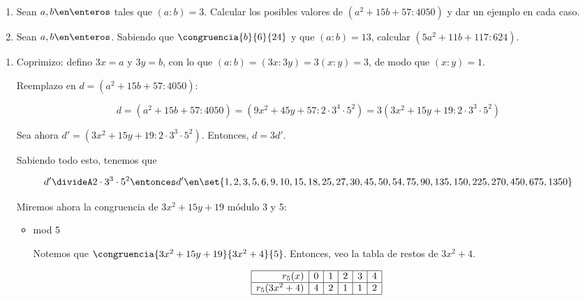 \begin{enunciado}{\ejercicio}

    \begin{enumerate}[label=(\alph*)]

        \item Sean $a,b \en \enteros$ tales que $(a:b)=3$. Calcular los posibles valores de $(a^2+15b+57:4050)$ y dar un ejemplo en cada caso.

        \item Sean $a,b \en \enteros$. Sabiendo que $\congruencia{b}{6}{24}$ y que $(a:b)=13$, calcular $(5a^2+11b+117:624)$.
    
    \end{enumerate}

\end{enunciado}

    \begin{enumerate}[label=(\alph*)]

        \item 

        Coprimizo: defino $3x=a$ y $3y=b$, con lo que $(a:b)=(3x:3y)=3(x:y)=3$, de modo que $(x:y)=1$. \bigskip

        Reemplazo en $d=(a^2+15b+57:4050):$ 

        $$
        d=(a^2+15b+57:4050) =
        (9x^2 + 45y +57:2 \cdot 3^4 \cdot 5^2)=
        3(3x^2 + 15y +19:2 \cdot 3^3 \cdot 5^2)
        $$

        Sea ahora $d'=(3x^2 + 15y +19:2 \cdot 3^3 \cdot 5^2)$. Entonces, $d=3d'$.\par
        Sabiendo todo esto, tenemos que

        $$
        d' \divideA 2 \cdot 3^3 \cdot 5^2
        \entonces
        d' \en \set{1,2,3,5,6,9,10,15,18,25,27,30,45,50,54,75,90,135,150,225,270,450,675,1350}
        $$

        Miremos ahora la congruencia de $3x^2 + 15y +19$ módulo 3 y 5:

          \begin{itemize}

            \item mod 5

            Notemos que $\congruencia{3x^2 + 15y +19}{3x^2+4}{5}$. Entonces, veo la tabla de restos de $3x^2+4$.

            $$
            \begin{array}{|r|c|c|c|c|c|}
              \hline
              r_5(x)      & 0 & 1 & 2 & 3 & 4 \\ \hline
              r_5(3x^2+4) & 4 & 2 & 1 & 1 & 2 \\ \hline
            \end{array}
           $$


\end{itemize}
\end{enumerate}
